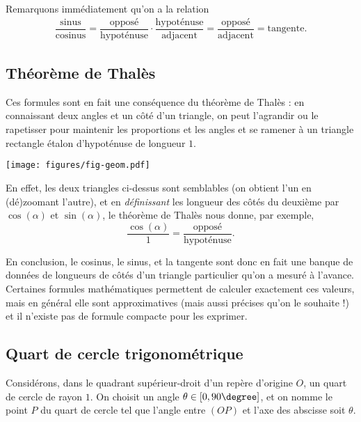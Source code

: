 Remarquons immédiatement qu'on a la relation
	\begin{align*}
		\dfrac{\text{sinus}}{\text{cosinus}}
		= \dfrac{\text{opposé}}{\text{hypoténuse}} \cdot \dfrac{\text{hypoténuse}}{\text{adjacent}}
		= \dfrac{\text{opposé}}{\text{adjacent}}
		 = \text{tangente}.
	\end{align*}



\subsection{Théorème de Thalès}
	
Ces formules sont en fait une conséquence du théorème de Thalès : en connaissant deux angles et un côté d'un triangle, on peut l'agrandir ou le rapetisser pour maintenir les proportions et les angles et se ramener à un triangle rectangle étalon d'hypoténuse de longueur $1$.

	\begin{center}
	\texttt{[image: figures/fig-geom.pdf]}
	\end{center}

En effet, les deux triangles ci-dessus sont semblables (on obtient l'un en (dé)zoomant l'autre), et en \emph{définissant} les longueur des côtés du deuxième par $\cos(\alpha)$ et $\sin(\alpha)$, le théorème de Thalès nous donne, par exemple,
	\[ \dfrac{\cos(\alpha)}{1} = \dfrac{\text{opposé}}{\text{hypoténuse}}. \]

En conclusion, le cosinus, le sinus, et la tangente sont donc en fait une banque de données de longueurs de côtés d'un triangle particulier qu'on a mesuré à l'avance.
Certaines formules mathématiques permettent de calculer exactement ces valeurs, mais en général elle sont approximatives (mais aussi précises qu'on le souhaite !) et il n'existe pas de formule compacte pour les exprimer.

\subsection{Quart de cercle trigonométrique}

Considérons, dans le quadrant supérieur-droit d'un repère d'origine $O$, un quart de cercle de rayon $1$.
On choisit un angle $\theta \in [0, 90\degree]$, et on nomme le point $P$ du quart de cercle tel que l'angle entre $(OP)$ et l'axe des abscisse soit $\theta$.

